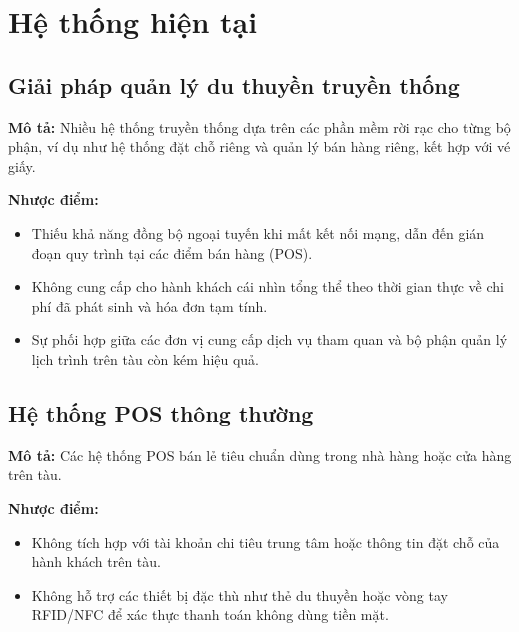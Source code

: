 \section{Hệ thống hiện tại}
\subsection{Giải pháp quản lý du thuyền truyền thống}
\textbf{Mô tả:} Nhiều hệ thống truyền thống dựa trên các phần mềm rời rạc cho từng bộ phận, ví dụ như hệ thống đặt chỗ riêng và quản lý bán hàng riêng, kết hợp với vé giấy.

\textbf{Nhược điểm:}
\begin{itemize}
    \item Thiếu khả năng đồng bộ ngoại tuyến khi mất kết nối mạng, dẫn đến gián đoạn quy trình tại các điểm bán hàng (POS).
    \item Không cung cấp cho hành khách cái nhìn tổng thể theo thời gian thực về chi phí đã phát sinh và hóa đơn tạm tính.
    \item Sự phối hợp giữa các đơn vị cung cấp dịch vụ tham quan và bộ phận quản lý lịch trình trên tàu còn kém hiệu quả.
\end{itemize}

\subsection{Hệ thống POS thông thường}
\textbf{Mô tả:} Các hệ thống POS bán lẻ tiêu chuẩn dùng trong nhà hàng hoặc cửa hàng trên tàu.

\textbf{Nhược điểm:}
\begin{itemize}
    \item Không tích hợp với tài khoản chi tiêu trung tâm hoặc thông tin đặt chỗ của hành khách trên tàu.
    \item Không hỗ trợ các thiết bị đặc thù như thẻ du thuyền hoặc vòng tay RFID/NFC để xác thực thanh toán không dùng tiền mặt.
\end{itemize}